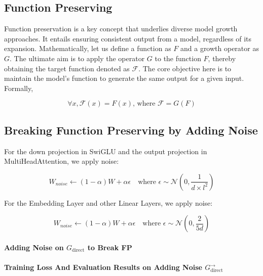 \documentclass{article}
\begin{document}
\subsection{Function Preserving}\label{app:fp}

Function preservation is a key concept that underlies diverse model growth approaches.
It entails ensuring consistent output from a model, regardless of its expansion.
Mathematically, let us define a function as $F$ and a growth operator as $G$.
The ultimate aim is to apply the operator $G$ to the function $F$, thereby obtaining the target function denoted as $\mathcal{F}$.
The core objective here is to maintain the model's function to generate the same output for a given input.
Formally, 

\begin{equation}
    \forall x, \mathcal{F}(x) = F(x) \text{, where }\mathcal{F} = G(F)
\end{equation}

\subsection{Breaking Function Preserving by Adding Noise}\label{app:noise}
For the down projection in SwiGLU and the output projection in MultiHeadAttention, we apply noise:

\begin{equation}
    W_{noise} \gets (1-\alpha)W + \alpha \epsilon \quad \text{where } \epsilon \sim \mathcal{N}(0, \frac{1}{d \times l^2})
\end{equation}

For the Embedding Layer and other Linear Layers, we apply noise:

\begin{equation}
    W_{noise} \gets (1-\alpha)W + \alpha \epsilon \quad \text{where } \epsilon \sim \mathcal{N}(0, \frac{2}{5d})
\end{equation}

\paragraph{Adding Noise on $G_{\text{direct}}$ to Break FP}

\paragraph{Training Loss And Evaluation Results on Adding Noise $G_{\text{direct}}^\to$}
\end{document}
